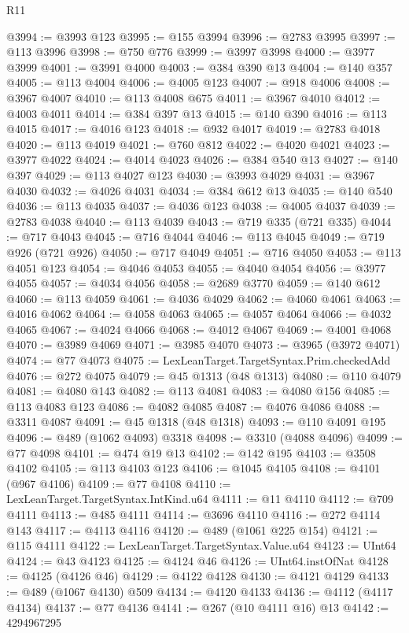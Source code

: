 \begin{lexlean}{R11}
\begin{coremodule}
@3994 := @3993 @123
@3995 := @155 @3994
@3996 := @2783 @3995
@3997 := @113 @3996
@3998 := @750 @776
@3999 := @3997 @3998
@4000 := @3977 @3999
@4001 := @3991 @4000
@4003 := @384 @390 @13
@4004 := @140 @357
@4005 := @113 @4004
@4006 := @4005 @123
@4007 := @918 @4006
@4008 := @3967 @4007
@4010 := @113 @4008 @675
@4011 := @3967 @4010
@4012 := @4003 @4011
@4014 := @384 @397 @13
@4015 := @140 @390
@4016 := @113 @4015
@4017 := @4016 @123
@4018 := @932 @4017
@4019 := @2783 @4018
@4020 := @113 @4019
@4021 := @760 @812
@4022 := @4020 @4021
@4023 := @3977 @4022
@4024 := @4014 @4023
@4026 := @384 @540 @13
@4027 := @140 @397
@4029 := @113 @4027 @123
@4030 := @3993 @4029
@4031 := @3967 @4030
@4032 := @4026 @4031
@4034 := @384 @612 @13
@4035 := @140 @540
@4036 := @113 @4035
@4037 := @4036 @123
@4038 := @4005 @4037
@4039 := @2783 @4038
@4040 := @113 @4039
@4043 := @719 @335 (@721 @335)
@4044 := @717 @4043
@4045 := @716 @4044
@4046 := @113 @4045
@4049 := @719 @926 (@721 @926)
@4050 := @717 @4049
@4051 := @716 @4050
@4053 := @113 @4051 @123
@4054 := @4046 @4053
@4055 := @4040 @4054
@4056 := @3977 @4055
@4057 := @4034 @4056
@4058 := @2689 @3770
@4059 := @140 @612
@4060 := @113 @4059
@4061 := @4036 @4029
@4062 := @4060 @4061
@4063 := @4016 @4062
@4064 := @4058 @4063
@4065 := @4057 @4064
@4066 := @4032 @4065
@4067 := @4024 @4066
@4068 := @4012 @4067
@4069 := @4001 @4068
@4070 := @3989 @4069
@4071 := @3985 @4070
@4073 := @3965 (@3972 @4071)
@4074 := @77 @4073
@4075 := LexLeanTarget.TargetSyntax.Prim.checkedAdd
@4076 := @272 @4075
@4079 := @45 @1313 (@48 @1313)
@4080 := @110 @4079
@4081 := @4080 @143
@4082 := @113 @4081
@4083 := @4080 @156
@4085 := @113 @4083 @123
@4086 := @4082 @4085
@4087 := @4076 @4086
@4088 := @3311 @4087
@4091 := @45 @1318 (@48 @1318)
@4093 := @110 @4091 @195
@4096 := @489 (@1062 @4093) @3318
@4098 := @3310 (@4088 @4096)
@4099 := @77 @4098
@4101 := @474 @19 @13
@4102 := @142 @195
@4103 := @3508 @4102
@4105 := @113 @4103 @123
@4106 := @1045 @4105
@4108 := @4101 (@967 @4106)
@4109 := @77 @4108
@4110 := LexLeanTarget.TargetSyntax.IntKind.u64
@4111 := @11 @4110
@4112 := @709 @4111
@4113 := @485 @4111
@4114 := @3696 @4110
@4116 := @272 @4114 @143
@4117 := @4113 @4116
@4120 := @489 (@1061 @225 @154)
@4121 := @115 @4111
@4122 := LexLeanTarget.TargetSyntax.Value.u64
@4123 := UInt64
@4124 := @43 @4123
@4125 := @4124 @46
@4126 := UInt64.instOfNat
@4128 := @4125 (@4126 @46)
@4129 := @4122 @4128
@4130 := @4121 @4129
@4133 := @489 (@1067 @4130) @509
@4134 := @4120 @4133
@4136 := @4112 (@4117 @4134)
@4137 := @77 @4136
@4141 := @267 (@10 @4111 @16) @13
@4142 := 4294967295

\end{coremodule}
\end{lexlean}
